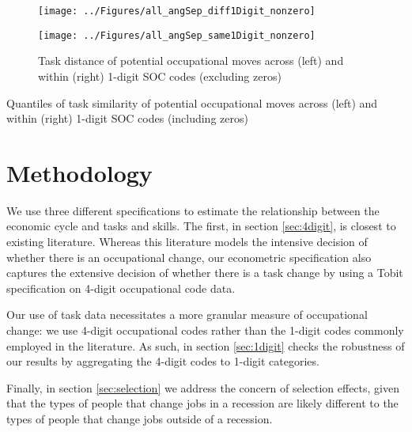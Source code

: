 \documentclass[11pt, oneside]{article}
\begin{document}
	\begin{figure}[H]
		\centering
		\begin{minipage}{.5\textwidth}
			\centering
			\texttt{[image: ../Figures/all\_angSep\_diff1Digit\_nonzero]}
		\end{minipage}%
		\begin{minipage}{.5\textwidth}
			\centering
			\texttt{[image: ../Figures/all\_angSep\_same1Digit\_nonzero]}
		\end{minipage}%
		\caption{Task distance of potential occupational moves across (left) and within (right) 1-digit SOC codes (excluding zeros)}
		\label{fig:angSep_diff}
	\end{figure}
	
	
	\begin{table}[H]
		\centering
		 
		\caption{Quantiles of task similarity of potential occupational moves across (left) and within (right) 1-digit SOC codes (including zeros)}
		\label{fig:angSep_quantile_diff_same}
	\end{table}
	
	
	
	
	




 \section{Methodology}
\label{sec:Model}

We use three different specifications to estimate the relationship between the economic cycle and tasks and skills. The first, in section \ref{sec:4digit},  is closest to existing literature. Whereas this literature models the intensive decision of whether there is an occupational change, our econometric specification also captures the extensive decision of whether there is a task change by using a Tobit specification on 4-digit occupational code data.

Our use of task data necessitates a more granular measure of occupational change: we use 4-digit occupational codes rather than the 1-digit codes commonly employed in the literature. As such, in section \ref{sec:1digit}  checks the robustness of our results by aggregating the 4-digit codes to 1-digit categories.

Finally, in section \ref{sec:selection} we address the concern of selection effects, given that the types of people that change jobs in a recession are likely different to the types of people that change jobs outside of a recession. 
\end{document}
